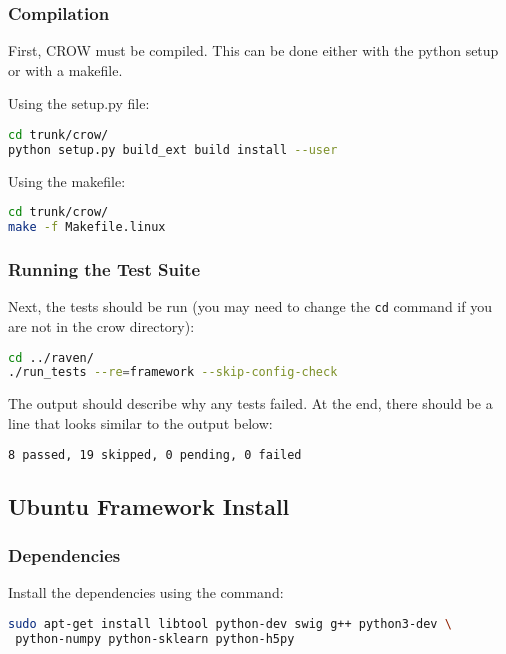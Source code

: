 \subsubsection{Compilation}

First, CROW must be compiled. This can be done either with the python setup or
with a makefile.

Using the setup.py file:
\begin{lstlisting}[language=bash]
cd trunk/crow/
python setup.py build_ext build install --user
\end{lstlisting}

Using the makefile:
\begin{lstlisting}[language=bash]
cd trunk/crow/
make -f Makefile.linux
\end{lstlisting}

\subsubsection{Running the Test Suite}

Next, the tests should be run (you may need to change the \texttt{cd}
command if you are not in the crow directory):

\begin{lstlisting}[language=bash]
cd ../raven/
./run_tests --re=framework --skip-config-check
\end{lstlisting}

The output should describe why any tests failed.
%
At the end, there should be a line that looks similar to the output below:
\begin{lstlisting}[language=bash]
8 passed, 19 skipped, 0 pending, 0 failed
\end{lstlisting}

\subsection{Ubuntu Framework Install}

\subsubsection{Dependencies}
Install the dependencies using the command:

\begin{lstlisting}[language=bash]
sudo apt-get install libtool python-dev swig g++ python3-dev \
 python-numpy python-sklearn python-h5py
\end{lstlisting}

